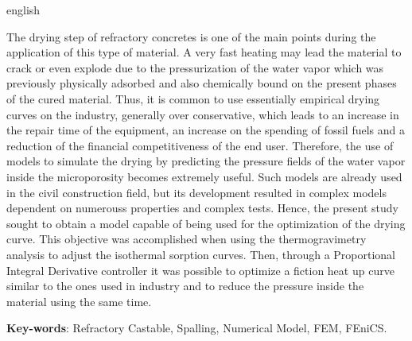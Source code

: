 \documentclass[
	12pt,				%
	openrany,			%
	oneside,			%
	a4paper,			%
	chapter=TITLE,		%
	english,			%
	french,				%
	spanish,			%
	brazil,				%
	hyphens,
  oldfontcommands]{abntex2}
\theoremstyle{definition}
\theoremstyle{definition}
\begin{document}
\begin{resumo}[Abstract]
\begin{otherlanguage*}{english}
\vspace{\onelineskip}

\noindent
The drying step of refractory concretes is one of the main points during the
application of this type of material. A very fast heating may lead the material
to crack or even explode due to the pressurization of the water vapor which was
previously physically adsorbed and also chemically bound on the present phases
of the cured material. Thus, it is common to use essentially empirical drying
curves on the industry, generally over conservative, which leads to an increase
in the repair time of the equipment, an increase on the spending of fossil fuels
and a reduction of the financial competitiveness of the end user. Therefore, the
use of models to simulate the drying by predicting the pressure fields of the
water vapor inside the microporosity becomes extremely useful. Such models are
already used in the civil construction field, but its development resulted in
complex models dependent on numerouss properties and complex tests. Hence, the
present study sought to obtain a model capable of being used for the
optimization of the drying curve. This objective was accomplished when using the
thermogravimetry analysis to adjust the isothermal sorption curves. Then,
through a Proportional Integral Derivative controller it was possible to
optimize a fiction heat up curve similar to the ones used in industry and to
reduce the pressure inside the material using the same time.

   \textbf{Key-words}: Refractory Castable, Spalling, Numerical Model, FEM, FEniCS.
   
 \end{otherlanguage*}
\end{resumo}

 
 

  
\end{document}
